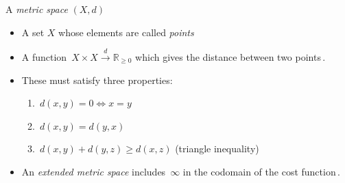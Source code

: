 
A \emph{metric space} $(X,d)$

\begin{itemize}
    \item  A set $X$ whose elements are called \emph{points}
    \item A function \,$X \times X \xrightarrow{d} \mathbb{R}_{\geq 0}$ which gives the distance between two points\,.
    \item These must satisfy three properties:
          \begin{enumerate}
            \item \,$d(x,y)=0 \iff x=y$\,
            \item \,$d(x,y)=d(y,x)$\,
            \item \,$d(x,y)+d(y,z)\geq d(x,z)$ (triangle inequality)\,
          \end{enumerate}
    \item An \emph{extended metric space} includes \,$\infty$ in the codomain of the cost function\,.
  \end{itemize}
